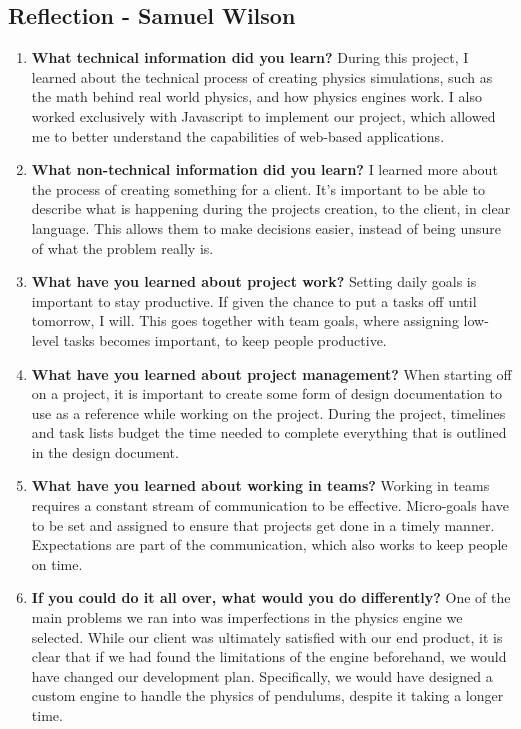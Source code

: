 \subsection{Reflection - Samuel Wilson}
\begin{enumerate}
\item \textbf{What technical information did you learn?}
During this project, I learned about the technical process of creating physics simulations, such as the math behind real world physics, and how physics engines work. I also worked exclusively with Javascript to implement our project, which allowed me to better understand the capabilities of web-based applications.
\item \textbf{What non-technical information did you learn?}
I learned more about the process of creating something for a client. It’s important to be able to describe what is happening during the projects creation, to the client, in clear language. This allows them to make decisions easier, instead of being unsure of what the problem really is.
\item \textbf{What have you learned about project work?}
Setting daily goals is important to stay productive. If given the chance to put a tasks off until tomorrow, I will. This goes together with team goals, where assigning low-level tasks becomes important, to keep people productive.
\item \textbf{What have you learned about project management?}
When starting off on a project, it is important to create some form of design documentation to use as a reference while working on the project. During the project, timelines and task lists budget the time needed to complete everything that is outlined in the design document.
\item \textbf{What have you learned about working in teams?}
Working in teams requires a constant stream of communication to be effective. Micro-goals have to be set and assigned to ensure that projects get done in a timely manner. Expectations are part of the communication, which also works to keep people on time.
\item \textbf{If you could do it all over, what would you do differently?}
One of the main problems we ran into was imperfections in the physics engine we selected. While our client was ultimately satisfied with our end product, it is clear that if we had found the limitations of the engine beforehand, we would have changed our development plan. Specifically, we would have designed a custom engine to handle the physics of pendulums, despite it taking a longer time.
\end{enumerate}